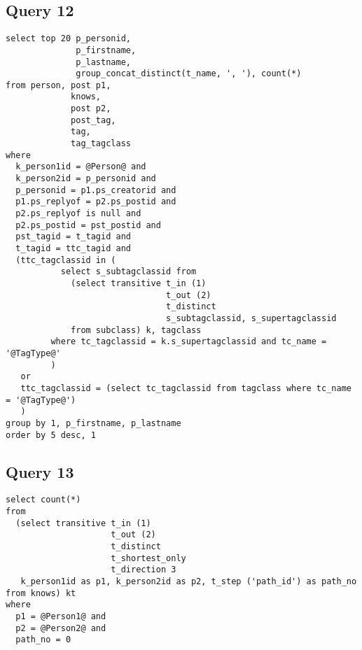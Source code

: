 \subsection{Query 12}
{\footnotesize
\begin{verbatim}
select top 20 p_personid, 
              p_firstname, 
              p_lastname, 
              group_concat_distinct(t_name, ', '), count(*)
from person, post p1, 
             knows, 
             post p2, 
             post_tag, 
             tag, 
             tag_tagclass
where
  k_person1id = @Person@ and
  k_person2id = p_personid and
  p_personid = p1.ps_creatorid and
  p1.ps_replyof = p2.ps_postid and
  p2.ps_replyof is null and
  p2.ps_postid = pst_postid and
  pst_tagid = t_tagid and
  t_tagid = ttc_tagid and
  (ttc_tagclassid in (
           select s_subtagclassid from
             (select transitive t_in (1) 
                                t_out (2) 
                                t_distinct 
                                s_subtagclassid, s_supertagclassid
             from subclass) k, tagclass
         where tc_tagclassid = k.s_supertagclassid and tc_name = '@TagType@'
         )
   or
   ttc_tagclassid = (select tc_tagclassid from tagclass where tc_name = '@TagType@')
   )
group by 1, p_firstname, p_lastname
order by 5 desc, 1

\end{verbatim}
}


\subsection{Query 13}
{\footnotesize
\begin{verbatim}
select count(*)
from
  (select transitive t_in (1) 
                     t_out (2) 
                     t_distinct 
                     t_shortest_only 
                     t_direction 3
   k_person1id as p1, k_person2id as p2, t_step ('path_id') as path_no from knows) kt
where
  p1 = @Person1@ and
  p2 = @Person2@ and
  path_no = 0
\end{verbatim}
}


